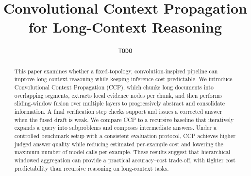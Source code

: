 \documentclass[11pt]{article}
\title{Convolutional Context Propagation for Long-Context Reasoning}
\author{\texttt{TODO}}
\date{}
\begin{document}
\maketitle

\begin{abstract}
This paper examines whether a fixed-topology, convolution-inspired pipeline can improve long-context reasoning while keeping inference cost predictable. We introduce Convolutional Context Propagation (CCP), which chunks long documents into overlapping segments, extracts local evidence nodes per chunk, and then performs sliding-window fusion over multiple layers to progressively abstract and consolidate information. A final verification step checks support and issues a corrected answer when the fused draft is weak. We compare CCP to a recursive baseline that iteratively expands a query into subproblems and composes intermediate answers. Under a controlled benchmark setup with a consistent evaluation protocol, CCP achieves higher judged answer quality while reducing estimated per-example cost and lowering the maximum number of model calls per example. These results suggest that hierarchical windowed aggregation can provide a practical accuracy--cost trade-off, with tighter cost predictability than recursive reasoning on long-context tasks.
\end{abstract}










\end{document}
